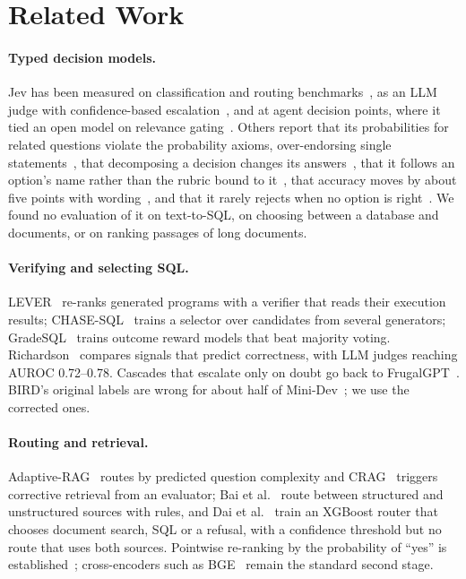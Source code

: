 \documentclass[runningheads,a4paper]{llncs}
\begin{document}
\section{Related Work}
\paragraph{Typed decision models.} Jev has been measured on classification and routing
benchmarks~\cite{deusser2026jev}, as an LLM judge with confidence-based escalation~\cite{li2026jevjudge}, and at
agent decision points, where it tied an open model on relevance gating~\cite{fastslow2026}. Others report that its probabilities
for related questions violate the probability axioms, over-endorsing single statements~\cite{axioms2026}, that
decomposing a decision changes its answers~\cite{coherence2026}, that it follows an option's name rather than the
rubric bound to it~\cite{sun2026typesafe,labels2026}, that accuracy moves by about five points with
wording~\cite{fastslow2026}, and that it rarely rejects when no option is right~\cite{missing2026}. We found no evaluation of it on text-to-SQL, on choosing between a database and documents, or
on ranking passages of long documents.

\paragraph{Verifying and selecting SQL.} LEVER~\cite{ni2023lever} re-ranks generated programs with a verifier that
reads their execution results; CHASE-SQL~\cite{pourreza2025chase} trains a selector over candidates from several
generators; GradeSQL~\cite{tritto2025gradesql} trains outcome reward models that beat majority voting.
Richardson~\cite{richardson2026predicts} compares signals that predict correctness, with LLM judges reaching AUROC
0.72--0.78. Cascades that escalate only on doubt go back to FrugalGPT~\cite{chen2023frugalgpt}. BIRD's
original labels are wrong for about half of Mini-Dev~\cite{jin2026annotation}; we use the corrected ones.

\paragraph{Routing and retrieval.} Adaptive-RAG~\cite{jeong2024adaptiverag} routes by predicted question complexity
and CRAG~\cite{yan2024crag} triggers corrective retrieval from an evaluator; Bai et al.~\cite{bai2025routing} route
between structured and unstructured sources with rules, and Dai et al.~\cite{dai2026xgboost} train an XGBoost router
that chooses document search, SQL or a refusal, with a confidence threshold but no route that uses both sources. Pointwise re-ranking by the probability of ``yes'' is
established~\cite{nogueira2020monot5,zhuang2023yesno}; cross-encoders such as BGE~\cite{chen2024bgem3} remain the standard second
stage.
\end{document}
